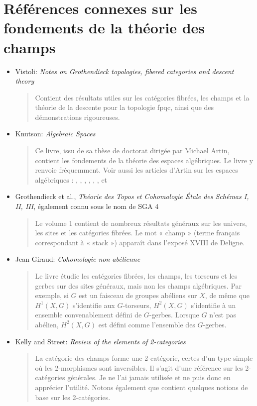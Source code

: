 \section{Références connexes sur les fondements de la théorie des champs}
\label{section-related}


\begin{itemize}
\item Vistoli:
\emph{Notes on Grothendieck topologies, fibered categories and descent theory}
\cite{vistoli_fga}
\begin{quote}
Contient des résultats utiles sur les catégories fibrées, les champs et la
théorie de la descente pour la topologie fpqc, ainsi que des démonstrations rigoureuses.
\end{quote}
\item Knutson: \emph{Algebraic Spaces} \cite{Kn}
\begin{quote}
Ce livre, issu de sa thèse de doctorat dirigée par Michael Artin,
contient les fondements de la théorie des espaces algébriques. Le livre
\cite{LM-B} y renvoie fréquemment. Voir aussi les articles d'Artin sur les
espaces algébriques : \cite{Artin-Algebraic-Approximation},
\cite{ArtinI}, \cite{Artin-Implicit-Function},
\cite{ArtinII}, \cite{Artin-Construction-Techniques},
\cite{Artin-Algebraic-Spaces}, \cite{Artin-Theorem-Representability} et
\cite{ArtinVersal}
\end{quote}
\item Grothendieck et al., \emph{Th\'eorie des Topos et Cohomologie \'Etale des
Sch\'emas I, II, III}, également connu sous le nom de SGA 4 \cite{SGA4}
\begin{quote}
Le volume 1 contient de nombreux résultats généraux sur les univers, les sites
et les catégories fibrées. Le mot « champ » (terme français correspondant à
« stack ») apparaît dans l'exposé XVIII de Deligne.
\end{quote}
\item Jean Giraud: \emph{Cohomologie non ab\'elienne} \cite{giraud}
\begin{quote}
Le livre étudie les catégories fibrées, les champs, les torseurs et les gerbes
sur des sites généraux, mais non les champs algébriques. Par exemple, si $G$ est
un faisceau de groupes abéliens sur $X$, de même que $H^1(X, G)$ s'identifie aux
$G$-torseurs, $H^2(X, G)$ s'identifie à un ensemble convenablement défini de
$G$-gerbes. Lorsque $G$ n'est pas abélien, $H^2(X, G)$ est défini comme
l'ensemble des $G$-gerbes.
\end{quote}
\item Kelly and Street: \emph{Review of the elements of 2-categories}
\cite{kelly-street}
\begin{quote}
La catégorie des champs forme une 2-catégorie, certes d'un type simple où les
2-morphismes sont inversibles. Il s'agit d'une référence sur les 2-catégories
générales. Je ne l'ai jamais utilisée et ne puis donc en apprécier l'utilité.
Notons également que \cite{stacks-project} contient quelques notions de base sur les 2-catégories.
\end{quote}
\end{itemize}




